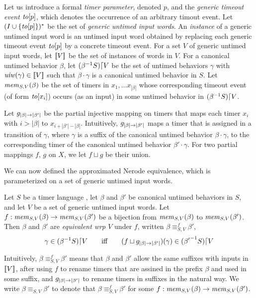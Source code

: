 Let us introduce a formal {\em timer parameter}, denoted $p$, and the
{\em generic timeout event} $\toevent{p}$,
which denotes the occurrence of an arbitrary timout event.
Let $(I \cup \set{\toevent{p}})^*$ be the set of
{\em generic untimed input words}.
An {\em instance} of a generic untimed input word is an untimed input
word obtained by replacing each generic timeout event
$\toevent{p}$ by a concrete timeout event.
For a set $V$ of generic untimed input words, let $\instancesof{V}$ be the
set of instances of words in $V$. For a canonical untimed
behavior $\beta$, let $\suffixbehs{S}{\beta}{V}$ be the set of untimed behaviors
$\gamma$ with $\untimedinputword(\gamma) \in \instancesof{V}$ such that
$\beta\cdot\gamma$ is a canonical untimed behavior in $S$. Let
$\getmemorable{S}{\beta}{V}$ be the set of timers in
$x_1 , \ldots x_{|\beta|}$ whose corresponding timeout event
(of form $\toevent{x_i}$) occurs (as an input) in some untimed behavior in
$\suffixbehs{S}{\beta}{V}$.

Let $\suffbij{\beta}{\beta'}$ be the partial injective mapping
on timers that maps each
timer $x_i$ with $i > |\beta|$ to $x_{i + |\beta'| - |\beta|}$.
Intuitively, $\suffbij{\beta}{\beta'}$ maps a timer that is assigned 
in a transition of $\gamma$, where $\gamma$ is a suffix of the canonical
untimed behavior $\beta \cdot \gamma$, to the corresponding timer of
the canonical untimed behavior $\beta'\cdot\gamma$.
For two partial mappings $f$, $g$ on $X$, we let $f \sqcup g$ be their
union. 


We can now defined the approximated Nerode equivalence, which is parameterized
on a set of generic untimed input words.

\begin{definition}
  \label{def:approx-nerode}
Let $S$ be a timer language ,
let $\beta$ and $\beta'$ be canonical untimed behaviors in $S$,
and let  $V$ be a set of
generic untimed input words.
Let $f : \getmemorable{S}{\beta}{V} \to \getmemorable{S}{\beta'}{V}$
be a bijection
from $\getmemorable{S}{\beta}{V}$ to $\getmemorable{S}{\beta'}{V}$.
Then $\beta$ and $\beta'$ are \emph{equivalent wrp $V$} under $f$, written
$\beta \equiv_{S,V}^f \beta'$, 
\[
\gamma \in \suffixbehs{S}{\beta}{V}
\qquad \mbox{iff} \qquad
(f \sqcup \suffbij{\beta}{\beta'}) (\gamma) \in \suffixbehs{S}{\beta'}{V}
\]
\end{definition}
Intuitively, $\beta \equiv_{S,V}^f \beta'$ means that $\beta$ and $\beta'$
allow the same suffixes with inputs in $\instancesof{V}$, after using
$f$ to rename timers that are assined in the prefix $\beta$ and used in some
suffix, and $\suffbij{\beta}{\beta'}$ to rename timers in suffixes in the
natural way.
We write $\beta \equiv_{S,V} \beta'$ to denote that
$\beta \equiv_{S,V}^f \beta'$ for some
$f : \getmemorable{S}{\beta}{V} \to \getmemorable{S}{\beta'}{V}$.

